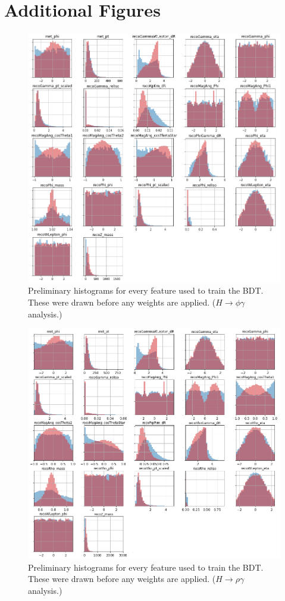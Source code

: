 \chapter{Additional Figures}

\begin{figure}[htb]
\begin{center}
\includegraphics[width=.7\linewidth]{Dissertation/fig/bdt-training.png}
\end{center}
\caption{Preliminary histograms for every feature used to train the BDT. These were drawn before any weights are applied. ($H\rightarrow\phi\gamma$ analysis.)}
\label{fig:bdt-training}
\end{figure}

\begin{figure}[htb]
\begin{center}
\includegraphics[width=.7\linewidth]{Dissertation/fig/bdt-training_rho.png}
\end{center}
\caption{Preliminary histograms for every feature used to train the BDT. These were drawn before any weights are applied. ($H\rightarrow\rho\gamma$ analysis.)}
\label{fig:bdt-training_rho}
\end{figure}

